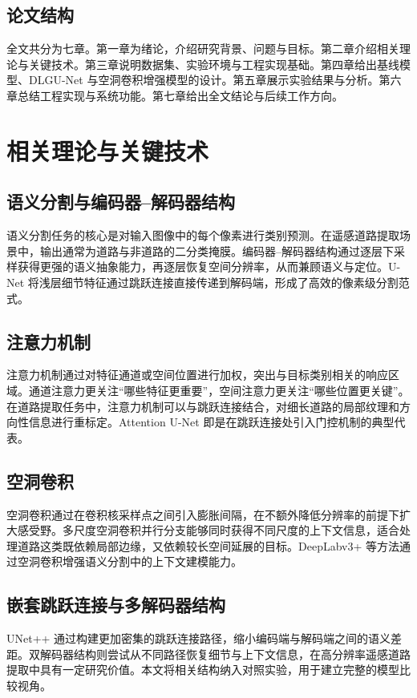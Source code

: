 \documentclass[12pt,a4paper]{ctexart}
\begin{document}
\subsection{论文结构}
全文共分为七章。第一章为绪论，介绍研究背景、问题与目标。第二章介绍相关理论与关键技术。第三章说明数据集、实验环境与工程实现基础。第四章给出基线模型、DLGU-Net 与空洞卷积增强模型的设计。第五章展示实验结果与分析。第六章总结工程实现与系统功能。第七章给出全文结论与后续工作方向。

\section{相关理论与关键技术}
\subsection{语义分割与编码器--解码器结构}
语义分割任务的核心是对输入图像中的每个像素进行类别预测。在遥感道路提取场景中，输出通常为道路与非道路的二分类掩膜。编码器--解码器结构通过逐层下采样获得更强的语义抽象能力，再逐层恢复空间分辨率，从而兼顾语义与定位。U-Net 将浅层细节特征通过跳跃连接直接传递到解码端，形成了高效的像素级分割范式\cite{unet2015}。

\subsection{注意力机制}
注意力机制通过对特征通道或空间位置进行加权，突出与目标类别相关的响应区域。通道注意力更关注“哪些特征更重要”，空间注意力更关注“哪些位置更关键”。在道路提取任务中，注意力机制可以与跳跃连接结合，对细长道路的局部纹理和方向性信息进行重标定。Attention U-Net 即是在跳跃连接处引入门控机制的典型代表\cite{attentionunet2018}。

\subsection{空洞卷积}
空洞卷积通过在卷积核采样点之间引入膨胀间隔，在不额外降低分辨率的前提下扩大感受野\cite{dilated2016}。多尺度空洞卷积并行分支能够同时获得不同尺度的上下文信息，适合处理道路这类既依赖局部边缘，又依赖较长空间延展的目标。DeepLabv3+ 等方法通过空洞卷积增强语义分割中的上下文建模能力\cite{deeplabv3plus2018}。

\subsection{嵌套跳跃连接与多解码器结构}
UNet++ 通过构建更加密集的跳跃连接路径，缩小编码端与解码端之间的语义差距\cite{unetpp2018}。双解码器结构则尝试从不同路径恢复细节与上下文信息，在高分辨率遥感道路提取中具有一定研究价值。本文将相关结构纳入对照实验，用于建立完整的模型比较视角。
\end{document}
